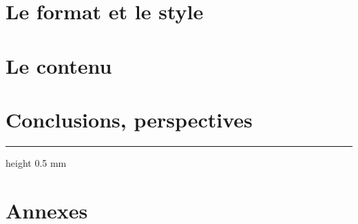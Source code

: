 \documentclass[12pt]{report}                 %
\newcommand{\vs}[1]{\vspace{ #1 cm}}
\begin{document}
\chapter{Le format et le style}


\chapter{Le contenu}
%

\chapter{Conclusions, perspectives}
%

\cite{*}

\hrule height 0.5 mm 

\vs{0.5}




\chapter{Annexes}
%
\end{document}
